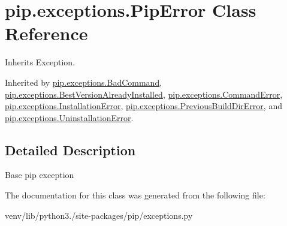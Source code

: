 \hypertarget{classpip_1_1exceptions_1_1_pip_error}{}\section{pip.\+exceptions.\+Pip\+Error Class Reference}
\label{classpip_1_1exceptions_1_1_pip_error}


Inherits Exception.



Inherited by \hyperlink{classpip_1_1exceptions_1_1_bad_command}{pip.\+exceptions.\+Bad\+Command}, \hyperlink{classpip_1_1exceptions_1_1_best_version_already_installed}{pip.\+exceptions.\+Best\+Version\+Already\+Installed}, \hyperlink{classpip_1_1exceptions_1_1_command_error}{pip.\+exceptions.\+Command\+Error}, \hyperlink{classpip_1_1exceptions_1_1_installation_error}{pip.\+exceptions.\+Installation\+Error}, \hyperlink{classpip_1_1exceptions_1_1_previous_build_dir_error}{pip.\+exceptions.\+Previous\+Build\+Dir\+Error}, and \hyperlink{classpip_1_1exceptions_1_1_uninstallation_error}{pip.\+exceptions.\+Uninstallation\+Error}.



\subsection{Detailed Description}
\begin{DoxyVerb}Base pip exception\end{DoxyVerb}
 

The documentation for this class was generated from the following file\+:\begin{DoxyCompactItemize}
\item 
venv/lib/python3./site-\/packages/pip/exceptions.\+py\end{DoxyCompactItemize}
